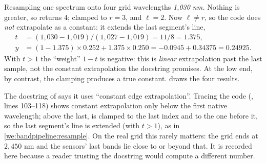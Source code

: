 \begin{worked}[label={we:bandpipeline:resample}]{Resampling one spectrum onto four grid wavelengths}
\emph{1,030 nm.} Nothing is greater, so  returns $4$; clamped to $r = 3$, and
$\ell = 2$. Now $\ell \ne r$, so the code does \emph{not} extrapolate as a constant: it extends the
last segment's line,
\begin{align*}
t &= (1{,}030 - 1{,}019)/(1{,}027 - 1{,}019) = 11/8 = 1.375,\\
y &= (1 - 1.375) \times 0.252 + 1.375 \times 0.250 = -0.0945 + 0.34375 = 0.24925.
\end{align*}
With $t > 1$ the ``weight'' $1 - t$ is negative: this is \emph{linear} extrapolation past the last
sample, not the constant extrapolation the docstring promises. At the low end, by contrast, the
clamping produces a true constant.  draws the four results.
\end{worked}

\begin{sourcenote}
The docstring of  says it uses ``constant edge extrapolation''. Tracing
the code (, lines 103--118) shows constant extrapolation only below the
first native wavelength; above the last,  is clamped to the last index and
 to the one before it, so the last segment's line is extended (with $t > 1$), as in
\cref{we:bandpipeline:resample}. On the real grid this rarely matters: the grid ends at $2{,}450$ nm
and the sensors' last bands lie close to or beyond that. It is recorded here because a reader trusting
the docstring would compute a different number.
\end{sourcenote}

